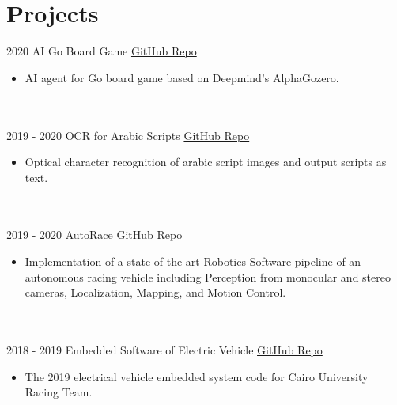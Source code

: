 \documentclass[letterpaper]{twentysecondcv} %
\begin{document}
\section{Projects }{\faClipboard}
\begin{twenty}

  \twentyitem
   		{2020}
		{}
        {AI Go Board Game}
        {\href{https://github.com/JoGo20/Implementation/}{GitHub Repo}}
        {}
        {\vspace{-2mm}\begin{itemize}[topsep=0pt,partopsep=0pt]
				\item  AI agent for Go board game based on Deepmind's AlphaGozero.
       
    \end{itemize}} \\\\

    \twentyitem
    {2019 - 2020}
 {}
     {OCR for Arabic Scripts}
     {\href{https://github.com/ahmedosama9777/OCR-for-Arabic-Scripts/}{GitHub Repo}}
     {}
     {\vspace{-2mm}\begin{itemize}[topsep=0pt,partopsep=0pt]
     \item  Optical character recognition of arabic script images and output scripts as text.
    
 \end{itemize}} \\\\

 \twentyitem
 {2019 - 2020}
{}
  {AutoRace}
  {\href{https://github.com/curtfs/CURT-FSAI/}{GitHub Repo}}
  {}
  {\vspace{-2mm}\begin{itemize}[topsep=0pt,partopsep=0pt]
  \item  Implementation of a state-of-the-art Robotics Software pipeline of an autonomous racing vehicle including Perception from monocular and stereo cameras, Localization, Mapping, and Motion Control.
 
\end{itemize}} \\\\

\twentyitem
   		{2018 - 2019}
		{}
        {Embedded Software of Electric Vehicle}
        {\href{https://https://github.com/curtfs/CURTEV-19/}{GitHub Repo}}
        {}
        {\vspace{-2mm}\begin{itemize}[topsep=0pt,partopsep=0pt]
				\item  The 2019 electrical vehicle embedded system code for Cairo University Racing Team.
       
    \end{itemize}} \\\\
      
   

 
			
	    
		

	
		
	
\end{twenty}
\end{document}
